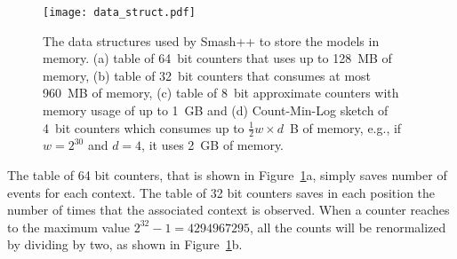 \documentclass[a4paper,num-refs]{oup-contemporary}
\begin{document}

 \begin{figure}[!h]
   \centering
   \texttt{[image: data\_struct.pdf]}
   \caption{The data structures used by Smash++ to store the models in memory. (a) table of 64~bit counters that uses up to 128~MB of memory, (b) table of 32~bit counters that consumes at most 960~MB of memory, (c) table of 8~bit approximate counters with memory usage of up to 1~GB and (d) Count-Min-Log sketch of 4~bit counters which consumes up to $\frac{1}{2} w\times d$~B of memory, e.g., if $w=2^{30}$ and $d=4$, it uses 2~GB of memory.}
   \label{fig.struct}
 \end{figure}

 The table of 64 bit counters, that is shown in Figure~\ref{fig.struct}a, simply saves number of events for each context. The table of 32 bit counters saves in each position the number of times that the associated context is observed. When a counter reaches to the maximum value $2^{32}-1=4294967295$, all the counts will be renormalized by dividing by two, as shown in Figure~\ref{fig.struct}b.
\end{document}
